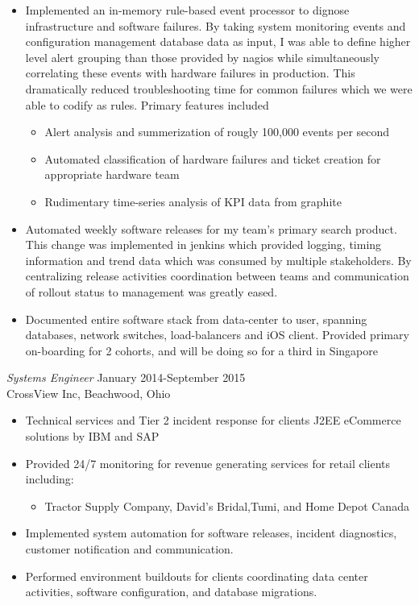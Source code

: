 \documentclass[margin, 10pt]{res} %
\begin{document}
\begin{resume}
\begin{itemize} \itemsep -2pt %
\item Implemented an in-memory rule-based event processor to dignose infrastructure and software failures.  By taking system monitoring events and configuration management database data as input, I was able to define higher level alert grouping than those provided by nagios while simultaneously correlating these events with hardware failures in production.  This dramatically reduced troubleshooting time for common failures which we were able to codify as rules.  Primary features included
  \begin{itemize} \itemsep -2pt %
    \item Alert analysis and summerization of rougly 100,000 events per second
    \item Automated classification of hardware failures and ticket creation for appropriate hardware team
    \item Rudimentary time-series analysis of KPI data from graphite
  \end{itemize}
\item Automated weekly software releases for my team's primary search product.  This change was implemented in jenkins which provided logging, timing information and trend data which was consumed by multiple stakeholders.  By centralizing release activities coordination between teams and communication of rollout status to management was greatly eased. \\
\item Documented entire software stack from data-center to user, spanning databases, network switches, load-balancers and iOS client.  Provided primary on-boarding for 2 cohorts, and will be doing so for a third in Singapore
\end{itemize}

{\sl Systems Engineer} \hfill January 2014-September 2015 \\
CrossView Inc, Beachwood, Ohio
\begin{itemize} 
\item Technical services and Tier 2 incident response for clients J2EE eCommerce solutions by IBM and SAP  
\item Provided 24/7 monitoring for revenue generating services for retail clients including:
  \begin{itemize}   
  \item Tractor Supply Company, David's Bridal,Tumi, and Home Depot Canada
  \end{itemize}
\item Implemented system automation for software releases, incident diagnostics, customer notification and communication.
\item Performed environment buildouts for clients coordinating data center activities, software configuration, and database migrations.



\end{itemize}
\end{resume}
\end{document}
